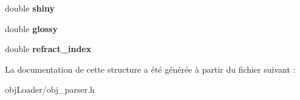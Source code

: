 \begin{DoxyCompactItemize}
\item 
\hypertarget{structobj__material_aa238fbf38e7eadb10ceed02324213d5d}{double {\bfseries shiny}}\label{structobj__material_aa238fbf38e7eadb10ceed02324213d5d}

\item 
\hypertarget{structobj__material_a9d648bad424ee96576ed2a2f2e604da6}{double {\bfseries glossy}}\label{structobj__material_a9d648bad424ee96576ed2a2f2e604da6}

\item 
\hypertarget{structobj__material_a6931b83a6b1e681d094751258189259b}{double {\bfseries refract\-\_\-index}}\label{structobj__material_a6931b83a6b1e681d094751258189259b}

\end{DoxyCompactItemize}


La documentation de cette structure a été générée à partir du fichier suivant \-:\begin{DoxyCompactItemize}
\item 
obj\-Loader/obj\-\_\-parser.\-h\end{DoxyCompactItemize}
